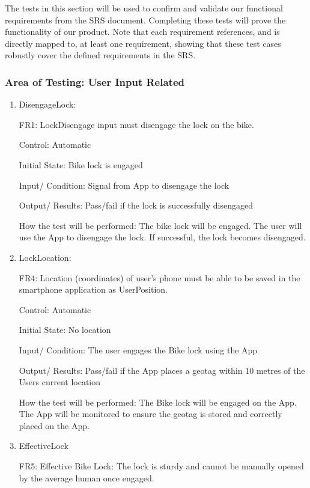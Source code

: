 \documentclass[12pt, titlepage]{article}
\begin{document}
The tests in this section will be used to confirm and validate our functional requirements from the SRS document. Completing these tests will prove the functionality of our product. Note that each requirement references, and is directly mapped to, at least one requirement, showing that these test cases robustly cover the defined requirements in the SRS.

\subsubsection{Area of Testing: User Input Related}

\begin{enumerate}

\item{DisengageLock: 

FR1: LockDisengage input must disengage the lock on the bike. } 

Control: Automatic 

Initial State: Bike lock is engaged 

Input/ Condition: Signal from App to disengage the lock 

Output/ Results: Pass/fail if the lock is successfully disengaged  

How the test will be performed: The bike lock will be engaged. The user will use the App to disengage the lock. If successful, the lock becomes disengaged. 

 
\item{LockLocation: 

FR4: Location (coordinates) of user’s phone must be able to be saved in the smartphone application as UserPosition. } 

Control: Automatic 

Initial State: No location  

Input/ Condition: The user engages the Bike lock using the App 

Output/ Results: Pass/fail if the App places a geotag within 10 metres of the Users current location 

How the test will be performed: The Bike lock will be engaged on the App. The App will be monitored to ensure the geotag is stored and correctly placed on the App.  

\item{EffectiveLock

FR5: Effective Bike Lock: The lock is sturdy and cannot be manually opened by the average human once engaged. }


\end{enumerate}
\end{document}
